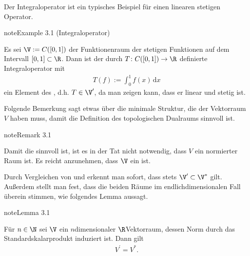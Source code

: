 \documentclass[letterpaper,10pt,english]{jupyterBook}
\begin{document}
\sphinxAtStartPar
Der Integraloperator ist ein typisches Beispiel für einen linearen stetigen Operator.
\label{vektoranalysis/multilinear:example-2}
\begin{sphinxadmonition}{note}{Example 3.1 (Integraloperator)}



\sphinxAtStartPar
Es sei \(\V := C([0,1])\) der Funktionenraum der stetigen Funktionen auf dem Intervall \([0,1] \subset \R\).
Dann ist der durch \(T \colon C([0,1]) \rightarrow \R\) definierte Integraloperator mit
\begin{equation*}
\begin{split}T(f) := \int_0^1 f(x) \, \mathrm{d}x\end{split}
\end{equation*}
\sphinxAtStartPar
ein Element des , d.h. \(T \in \V^\prime\), da man zeigen kann, dass er linear und stetig ist.
\end{sphinxadmonition}

\sphinxAtStartPar
Folgende Bemerkung sagt etwas über die minimale Struktur, die der Vektorraum \(V\) haben muss, damit die Definition des topologischen Dualraums sinnvoll ist.
\label{vektoranalysis/multilinear:remark-3}
\begin{sphinxadmonition}{note}{Remark 3.1}



\sphinxAtStartPar
Damit die {\hyperref[\detokenize{vektoranalysis/multilinear:def:topologischerDualraum}]{}} sinnvoll ist, ist es in der Tat nicht notwendig, dass \(V\) ein normierter Raum ist. Es reicht anzunehmen, dass \(\V\) ein  ist.
\end{sphinxadmonition}

\sphinxAtStartPar
Durch Vergleichen von {\hyperref[\detokenize{vektoranalysis/multilinear:def:algebraischerDualraum}]{}} und {\hyperref[\detokenize{vektoranalysis/multilinear:def:topologischerDualraum}]{}} erkennt man sofort, dass stets \(\V^\prime\subset \V^\ast\) gilt.
Außerdem stellt man fest, dass die beiden Räume im endlich\sphinxhyphen{}dimensionalen Fall überein stimmen, wie folgendes Lemma aussagt.
\label{vektoranalysis/multilinear:lemma-4}
\begin{sphinxadmonition}{note}{Lemma 3.1}



\sphinxAtStartPar
Für \(n\in\N\) sei \(\V\) ein \(n\)\sphinxhyphen{}dimensionaler \(\R\)\sphinxhyphen{}Vektorraum, dessen Norm durch das Standardskalarprodukt induziert ist.
Dann gilt
\begin{equation*}
\begin{split}V^\prime = V^\ast.\end{split}
\end{equation*}\end{sphinxadmonition}
\end{document}
